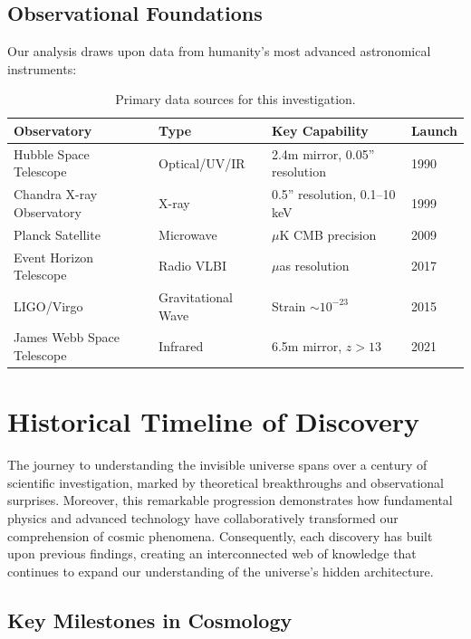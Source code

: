 \documentclass[11pt,a4paper]{article}
\begin{document}
\subsection{Observational Foundations}

Our analysis draws upon data from humanity's most advanced astronomical instruments:

\begin{table}[H]
\centering
\caption{Primary data sources for this investigation.}
\label{tab:data_sources}
\small
\begin{tabular}{|l|l|l|l|}
\hline
\textbf{Observatory} & \textbf{Type} & \textbf{Key Capability} & \textbf{Launch} \\
\hline
Hubble Space Telescope & Optical/UV/IR & 2.4m mirror, 0.05'' resolution & 1990 \\
Chandra X-ray Observatory & X-ray & 0.5'' resolution, 0.1--10 keV & 1999 \\
Planck Satellite & Microwave & $\mu$K CMB precision & 2009 \\
Event Horizon Telescope & Radio VLBI & $\mu$as resolution & 2017 \\
LIGO/Virgo & Gravitational Wave & Strain $\sim 10^{-23}$ & 2015 \\
James Webb Space Telescope & Infrared & 6.5m mirror, $z > 13$ & 2021 \\
\hline
\end{tabular}
\end{table}

\newpage

\section{Historical Timeline of Discovery}
\label{sec:history}

The journey to understanding the invisible universe spans over a century of scientific investigation, marked by theoretical breakthroughs and observational surprises. Moreover, this remarkable progression demonstrates how fundamental physics and advanced technology have collaboratively transformed our comprehension of cosmic phenomena. Consequently, each discovery has built upon previous findings, creating an interconnected web of knowledge that continues to expand our understanding of the universe's hidden architecture.

\subsection{Key Milestones in Cosmology}
\end{document}

